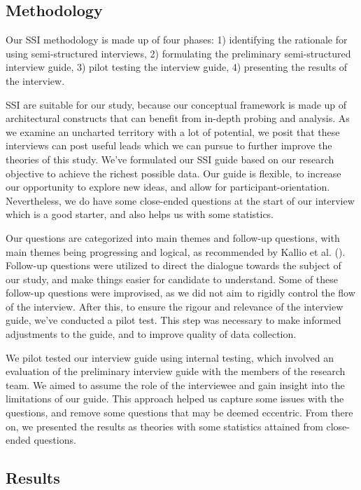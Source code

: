 \documentclass[conference]{IEEEtran}
\begin{document}
\subsection{Methodology}
Our SSI methodology is made up of four phases: 1) identifying the rationale for using semi-structured interviews, 2) formulating the preliminary semi-structured interview guide, 3) pilot testing the interview guide, 4) presenting the results of the interview. 

SSI are suitable for our study, because our conceptual framework is made up of architectural constructs that can benefit from in-depth probing and analysis. As we examine an uncharted territory with a lot of potential, we posit that these interviews can post useful leads which we can pursue to further improve the theories of this study. We've formulated our SSI guide based on our research objective to achieve the richest possible data. Our guide is flexible, to increase our opportunity to explore new ideas, and allow for participant-orientation. Nevertheless, we do have some close-ended questions at the start of our interview which is a good starter, and also helps us with some statistics. 

Our questions are categorized into main themes and follow-up questions, with main themes being progressing and logical, as recommended by Kallio et al. (\cite{kallio2016systematic}). Follow-up questions were utilized to direct the dialogue towards the subject of our study, and make things easier for candidate to understand. Some of these follow-up questions were improvised, as we did not aim to rigidly control the flow of the interview. After this, to ensure the rigour and relevance of the interview guide, we've conducted a pilot test. This step was necessary to make informed adjustments to the guide, and to improve quality of data collection. 

We pilot tested our interview guide using internal testing, which involved an evaluation of the preliminary interview guide with the members of the research team. We aimed to assume the role of the interviewee and gain insight into the limitations of our guide. This approach helped us capture some issues with the questions, and remove some questions that may be deemed eccentric. From there on, we presented the results as theories with some statistics attained from close-ended questions. 

\subsection{Results}
\end{document}
